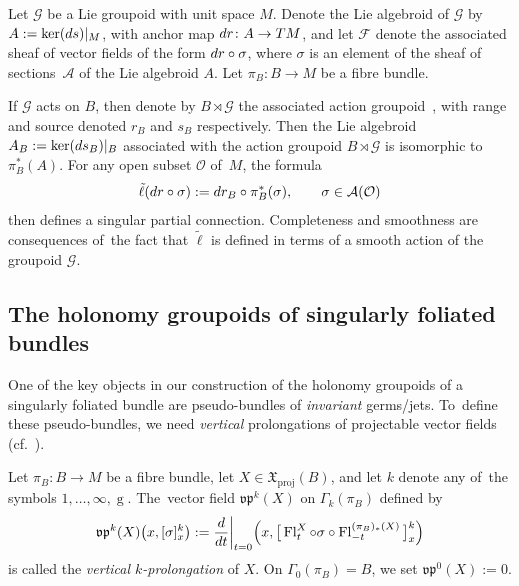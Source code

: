 \documentclass[11pt]{article}
\numberwithin{equation}{section}
\numberwithin{equation}{section}
\def\g{\operatorname{g}}
\def\proj{\operatorname{proj}}
\def\Fl{\operatorname{Fl}}
\def\FF{{\mathcal{F}}}
\def\AA{{\mathcal{A}}}
\def\GG{{\mathcal{G}}}
\def\OO{{\mathcal{O}}}
\def\XF{{\mathfrak{X}}}
\def\vpf{{\mathfrak{vp}}}
\begin{document}
\begin{Example}\label{equiex}
Let $\GG$ be a Lie groupoid with unit space $M$. Denote the Lie algebroid of $\GG$ by $A:=\ker({\rm d}s)|_{M}$, with anchor map ${\rm d}r\colon A\rightarrow TM$, and let $\FF$ denote the associated sheaf of vector fields of the form ${\rm d}r\circ\sigma$, where $\sigma$ is an element of the sheaf of sections~$\AA$ of the Lie algebroid $A$. Let $\pi_{B}\colon B\rightarrow M$ be a fibre bundle.

If $\GG$ acts on $B$, then denote by $B\rtimes\GG$ the associated action groupoid~\cite[Example 2.2]{aac1}, with range and source denoted $r_{B}$ and $s_{B}$ respectively. Then the Lie algebroid $A_{B}:=\ker({\rm d}s_{B})|_{B}$ associated with the action groupoid $B\rtimes\GG$ is isomorphic to $\pi_{B}^{*}(A)$. For any open subset $\OO$ of~$M$, the formula
\begin{gather*}
\tilde{\ell}({\rm d}r\circ\sigma):={\rm d}r_{B}\circ\pi_{B}^{*}(\sigma),\qquad \sigma\in\AA(\OO)
\end{gather*}
then defines a singular partial connection. Completeness and smoothness are consequences of~the fact that $\tilde{\ell}$ is defined in terms of a smooth action of the groupoid $\GG$.
\end{Example}


\subsection{The holonomy groupoids of singularly foliated bundles}

One of the key objects in our construction of the holonomy groupoids of a singularly foliated bundle are pseudo-bundles of \textit{invariant} germs/jets. To~define these pseudo-bundles, we need \textit{vertical} prolongations of projectable vector fields (cf.~\cite[Definition~1.15]{varbi}).

\begin{Definition}
Let $\pi_{B}\colon B\rightarrow M$ be a fibre bundle, let $X\in\XF_{\proj}(B)$, and let $k$ denote any of~the symbols $1,\dots,\infty,\g$. The~vector field $\vpf^{k}(X)$ on $\Gamma_{k}(\pi_{B})$ defined by
\begin{gather*}
\vpf^{k}(X)\big(x,[\sigma]^{k}_{x}\big):=\frac{\rm d}{{\rm d}t}\bigg|_{t=0}\Big(x,\big[\Fl^{X}_{t}\circ\sigma\circ\Fl^{(\pi_{B})_{*}(X)}_{-t}\big]_{x}^{k}\Big)
\end{gather*}
is called the \textit{vertical $k$-prolongation} of $X$. On $\Gamma_{0}(\pi_{B}) = B$, we set $\vpf^{0}(X):=0$.
\end{Definition}
\end{document}

